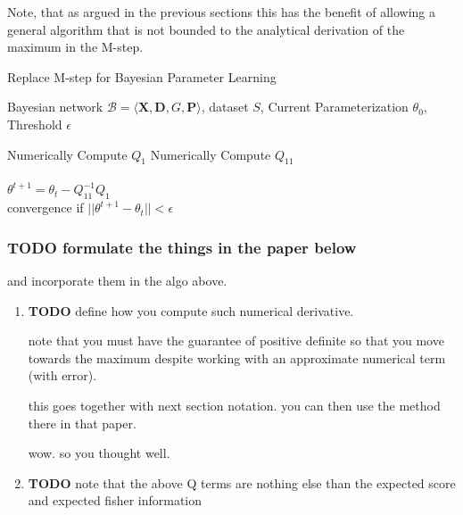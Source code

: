 \documentclass[11pt]{article}
\begin{document}
\begin{article}
Note, that as argued in the previous sections this has the benefit
of allowing a general algorithm that is not bounded to the
analytical derivation of the maximum in the M-step.

\begin{algorithm*}[h!]
\caption{Replace M-step for Bayesian Parameter Learning}
\label{alg:Numerical-M-Step}
\vspace{-10pt}
\begin{multicols}{2}
\begin{algorithmic}[1] 
\Require Bayesian network $\mathcal{B}=\langle \mathbf{X},\mathbf{D}, G, \mathbf{P} \rangle$, dataset $S$, Current Parameterization $\theta_0$, Threshold $\epsilon$

   \State Numerically Compute $Q_1$
   \State Numerically Compute $Q_{11}$\\

   \\
      \State $\theta^{t+1}= \theta_{t} - Q_{11}^{-1} Q_1$\\
      \State convergence if $||\theta^{t+1} - \theta_{t}|| < \epsilon$
   \EndForAll
\end{algorithmic}
\end{multicols}
\end{algorithm*}


\subsubsection{{\bfseries\sffamily TODO} formulate the things in the paper below}
\label{sec:org8ef1bd5}

and incorporate them in the algo above.

\begin{enumerate}
\item {\bfseries\sffamily TODO} define how you compute such numerical derivative.
\label{sec:orgdf7b865}

note that you must have the guarantee of positive definite so that
you move towards the maximum despite working with an approximate
numerical term (with error).

this goes together with next section notation. you can then use the
method there in that paper.

wow. so you thought well.


\item {\bfseries\sffamily TODO} note that the above Q terms are nothing else than the expected score and expected fisher information
\label{sec:org06b5e62}


\end{enumerate}
\end{article}
\end{document}
